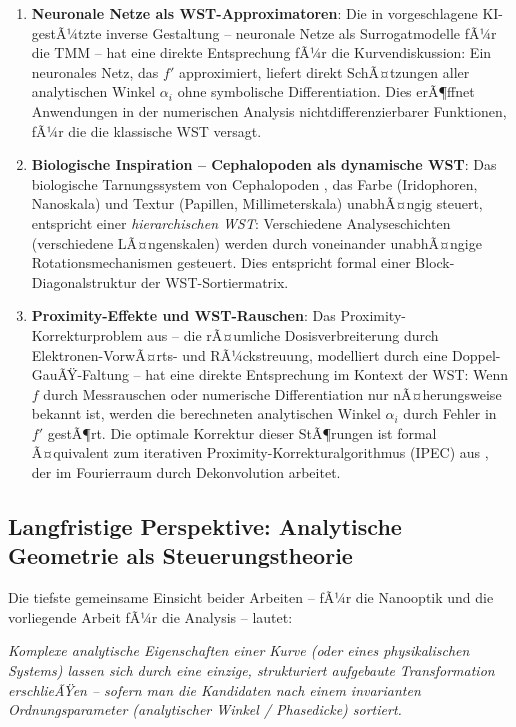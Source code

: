 ﻿\documentclass[12pt, a4paper]{article}
\theoremstyle{definition}
\begin{document}
\begin{enumerate}[leftmargin=*, label=\textbf{F\arabic*.}]
		\item \textbf{Neuronale Netze als WST-Approximatoren}: Die in \cite{oqtum}
		vorgeschlagene KI-gestÃ¼tzte inverse Gestaltung -- neuronale Netze
		als Surrogatmodelle fÃ¼r die TMM -- hat eine direkte Entsprechung fÃ¼r
		die Kurvendiskussion: Ein neuronales Netz, das $f'$ approximiert,
		liefert direkt SchÃ¤tzungen aller analytischen Winkel $\alpha_i$ ohne
		symbolische Differentiation. Dies erÃ¶ffnet Anwendungen in der
		numerischen Analysis nichtdifferenzierbarer Funktionen, fÃ¼r die die
		klassische WST versagt.
		
		\item \textbf{Biologische Inspiration -- Cephalopoden als dynamische WST}:
		Das biologische Tarnungssystem von Cephalopoden \cite{oqtum}, das Farbe
		(Iridophoren, Nanoskala) und Textur (Papillen, Millimeterskala) unabhÃ¤ngig
		steuert, entspricht einer \emph{hierarchischen WST}: Verschiedene
		Analyseschichten (verschiedene LÃ¤ngenskalen) werden durch voneinander
		unabhÃ¤ngige Rotationsmechanismen gesteuert. Dies entspricht formal einer
		Block-Diagonalstruktur der WST-Sortiermatrix.
		
		\item \textbf{Proximity-Effekte und WST-Rauschen}: Das Proximity-Korrekturproblem
		aus \cite{oqtum} -- die rÃ¤umliche Dosisverbreiterung durch Elektronen-VorwÃ¤rts-
		und RÃ¼ckstreuung, modelliert durch eine Doppel-GauÃŸ-Faltung -- hat eine
		direkte Entsprechung im Kontext der WST: Wenn $f$ durch Messrauschen oder
		numerische Differentiation nur nÃ¤herungsweise bekannt ist, werden die
		berechneten analytischen Winkel $\alpha_i$ durch Fehler in $f'$
		gestÃ¶rt. Die optimale Korrektur dieser StÃ¶rungen ist formal Ã¤quivalent
		zum iterativen Proximity-Korrekturalgorithmus (IPEC) aus \cite{oqtum},
		der im Fourierraum durch Dekonvolution arbeitet.
	\end{enumerate}
	
	\subsection{Langfristige Perspektive: Analytische Geometrie als Steuerungstheorie}
	
	Die tiefste gemeinsame Einsicht beider Arbeiten -- \cite{oqtum} fÃ¼r die Nanooptik
	und die vorliegende Arbeit fÃ¼r die Analysis -- lautet:
	
	\begin{center}
		\emph{Komplexe analytische Eigenschaften einer Kurve (oder eines physikalischen
			Systems) lassen sich durch eine einzige, strukturiert aufgebaute Transformation
			erschlieÃŸen -- sofern man die Kandidaten nach einem invarianten Ordnungsparameter
			(analytischer Winkel / Phasedicke) sortiert.}
	\end{center}
	
\end{document}
